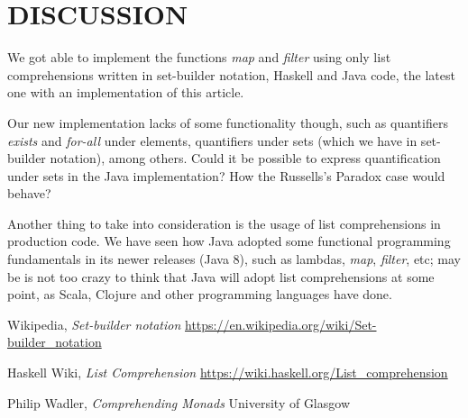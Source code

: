 \documentclass[%
 reprint,
 amsmath,amssymb,
 aps,
]{revtex4-1}
\begin{document}
\section{DISCUSSION}

	We got able to implement the functions \emph{map} and \emph{filter} using only list comprehensions written in set-builder notation, Haskell and Java code, the latest one with an implementation of this article.

	Our new implementation lacks of some functionality though, such as quantifiers \emph{exists} and \emph{for-all} under elements, quantifiers under sets (which we have in set-builder notation), among others. Could it be possible to express quantification under sets in the Java implementation? How the Russells's Paradox case would behave?

    Another thing to take into consideration is the usage of list comprehensions in production code. We have seen how Java adopted some functional programming fundamentals in its newer releases (Java 8), such as lambdas, \emph{map}, \emph{filter}, etc; may be is not too crazy to think that Java will adopt list comprehensions at some point, as Scala, Clojure and other programming languages have done.

\begin{thebibliography}{9}
Wikipedia, \emph{Set-builder notation} \url{https://en.wikipedia.org/wiki/Set-builder_notation}

Haskell Wiki, \emph{List Comprehension} \url{https://wiki.haskell.org/List_comprehension}

Philip Wadler, \emph{Comprehending Monads} University of Glasgow

\end{thebibliography}
\end{document}
